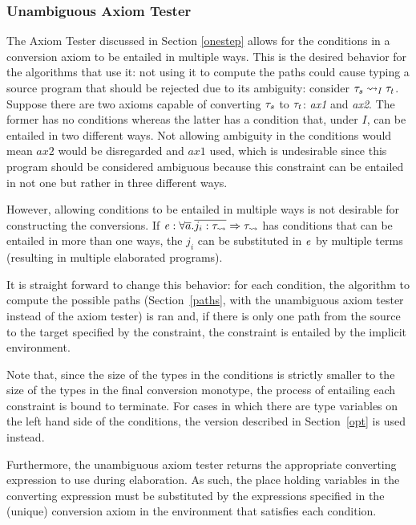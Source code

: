 \subsubsection{Unambiguous Axiom Tester}
\label{uat}

The Axiom Tester discussed in Section \ref{onestep} allows for the conditions in a conversion axiom to be entailed in multiple ways. This is the desired behavior for the algorithms that use it:  not using it to compute the paths could cause typing a source program that should be rejected due to its ambiguity: consider  ${\mathit{\tau}_s} \rightsquigarrow_{I} {\mathit{\tau}_t}$. Suppose there are two axioms capable of converting $\mathit{\tau}_s$ to $\mathit{\tau}_t$: \textit{ax1} and \textit{ax2}. The former has no conditions whereas the latter has a condition that, under $I$, can be entailed in two different ways. Not allowing ambiguity in the conditions would mean $ax2$ would be disregarded and $ax1$ used, which is undesirable since this program should be considered ambiguous because this constraint can be entailed in not one but rather in three different ways.

However, allowing conditions to be entailed in multiple ways is not desirable for constructing the conversions. If $\mathit{e} :\forall \overline{a} . \overline{j_i : \mathit{\tau_{\rightsquigarrow}}} \Rightarrow \mathit{\tau_{\rightsquigarrow}}$ has conditions that can be entailed in more than one ways, the $j_i$ can be substituted in $\mathit{e}$ by multiple terms (resulting in multiple elaborated programs).

It is straight forward to change this behavior: for each condition, the algorithm to compute the possible paths (Section~\ref{paths}, with the unambiguous axiom tester instead of the axiom tester) is ran and, if there is only one path from the source to the target specified by the constraint, the constraint is entailed by the implicit environment.

Note that, since the size of the types in the conditions is strictly smaller to the size of the types in the final conversion monotype, the process of entailing each constraint is bound to terminate. For cases in which there are type variables on the left hand side of the conditions, the version described in Section~\ref{opt} is used instead.

Furthermore, the unambiguous axiom tester returns the appropriate converting expression to use during elaboration. As such, the place holding variables in the converting expression must be substituted by the expressions specified in the (unique) conversion axiom in the environment that satisfies each condition.

